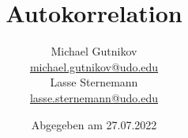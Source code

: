 

\title{Autokorrelation}
\author{
  Michael Gutnikov\\
  \href{mailto:michael.gutnikov@udo.edu}{michael.gutnikov@udo.edu}\\
  Lasse Sternemann\\
  \href{mailto:lasse.sternemann@udo.edu}{lasse.sternemann@udo.edu}
}
\date{Abgegeben am 27.07.2022}


    \maketitle
    \newpage
    \tableofcontents
    \newpage

    
    
    
    


    \newpage
    \printbibliography

